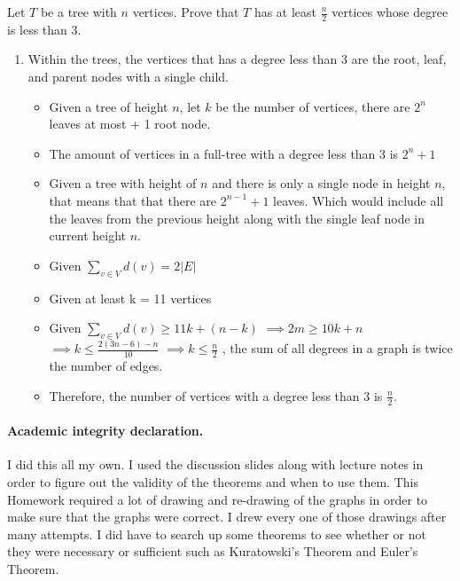 \documentclass[11pt]{article}
\newcounter{prnum}
\newenvironment{problem}{{\vskip 0.2in\noindent\bf Problem
       \addtocounter{prnum}{1} \arabic{prnum}.}}{\vskip 0.1in}
\begin{document}
\begin{problem}
    Let $T$ be a tree with $n$ vertices. Prove that $T$ has at least $\frac{n}{2}$ vertices whose degree is less than 3.
  \begin{enumerate}
    \item Within the trees, the vertices that has a degree less than 3 are the root, leaf, and parent nodes with a single child.
      \begin{itemize}
        \item Given a tree of height $n$, let $k$ be the number of vertices, there are $2^n$ leaves at most + 1 root node.
        \item The amount of vertices in a full-tree with a degree less than 3 is $2^n + 1$
        \item Given a tree with height of $n$ and there is only a single node in height $n$, that means that that there are $2^{n-1} + 1$ leaves.
          Which would include all the leaves from the previous height along with the single leaf node in current height $n$.
        \item Given $\sum_{v \in V} d(v) = 2|E|$
        \item Given at least k = 11 vertices
        \item Given $\sum_{v \in V} d(v) \geq 11k + (n-k)$
          $\implies 2m \geq 10k + n$
          $\implies k \leq \frac{2(3n-6)-n}{10}$
          $\implies k \leq \frac{n}{2}$
          , the sum of all degrees in a graph is twice the number of edges.
        \item Therefore, the number of vertices with a degree less than 3 is $\frac{n}{2}$.
      \end{itemize}
  \end{enumerate}
\end{problem}
  


\vskip 0.2in
\paragraph{Academic integrity declaration.}
I did this all my own. I used the discussion slides along with lecture notes in order to figure out the validity of the theorems and when to use them.
This Homework required a lot of drawing and re-drawing of the graphs in order to make sure that the graphs were correct.
I drew every one of those drawings after many attempts. I did have to search up some theorems to see whether or not they were
necessary or sufficient such as Kuratowski's Theorem and Euler's Theorem.
\end{document}
